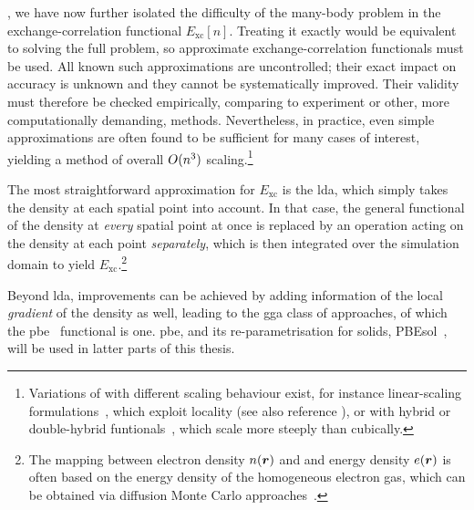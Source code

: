 , we have now further isolated the difficulty of the many-body problem in the exchange-correlation functional $E_{\text{xc}}[n]$.
Treating it exactly would be equivalent to solving the full problem, so approximate exchange-correlation functionals must be used.
All known such approximations are uncontrolled; their exact impact on accuracy is unknown and they cannot be systematically improved.
Their validity must therefore be checked empirically, comparing to experiment or other, more computationally demanding, methods.
Nevertheless, in practice, even simple approximations are often found to be sufficient for many cases of interest, yielding a method of overall $O(n^3)$ scaling.\footnote{Variations of \dft with different scaling behaviour exist, for instance linear-scaling formulations~\cite{k1996p,g1999p,bm2012p}, which exploit locality (see also reference \cite[ch.~18]{martin2020}), or \dft with hybrid or double-hybrid funtionals~\cite{g2006p}, which scale more steeply than cubically.}

The most straightforward approximation for $E_{\text{xc}}$ is the \gls{lda}, which simply takes the density at each spatial point into account. In that case, the general functional of the density at \emph{every} spatial point at once is replaced by an operation acting on the density at each point \emph{separately}, which is then integrated over the simulation domain to yield $E_{\text{xc}}$.\footnote{The mapping between electron density $n(
\boldsymbol{r})$ and and energy density $e(\boldsymbol{r})$ is often based on the energy density of the homogeneous electron gas, which can be obtained via diffusion Monte Carlo approaches~\cite{ca1980p}.}

Beyond \gls{lda}, improvements can be achieved by adding information of the local \emph{gradient} of the density as well, leading to the \gls{gga} class of approaches, of which the \gls{pbe}~\cite{pbe1996p} functional is one. \Gls{pbe}, and its re-parametrisation for solids, PBEsol~\cite{przb2008t}, will be used in latter parts of this thesis.

